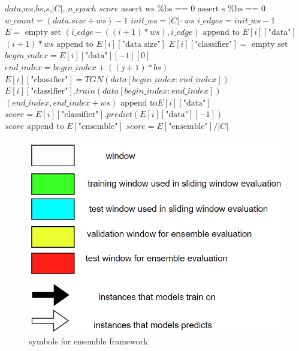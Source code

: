 \documentclass{IEEEtran}
\begin{document}
\begin{algorithm*}
\begin{algorithmic}[1]
\REQUIRE  $data$,$ws$,$bs$,$s$,$\vert C \vert$, $n\_epoch$
\ENSURE $score$
\STATE $\text{assert ws \% bs == 0}$
\STATE $\text{assert s \% bs == 0}$
\STATE $w\_count = (data.size \div ws) - 1$ 
\STATE $init\_ws = \vert C \vert \cdot ws$ 
\STATE $i\_edges = init\_ws - 1$  
\STATE $E = \text{ empty set} $ 
    \STATE $(i\_edge - ((i + 1) *  ws), i\_edge) \text{ append to }E[i][\text{"data"}]$
    \STATE $(i + 1) * ws \text{ append to }E[i][\text{"data size"}]$
    \STATE $E[i][\text{"classifier"}] = \text{ empty set}$
\ENDFOR
{}
                \STATE $begin\_index = E[i][\text{"data"}][-1][0]$
                \STATE $end\_index = begin\_index + ((j + 1) * bs)$
                    \STATE $E[i][\text{"classifier"}] = TGN(data[begin\_index:end\_index])$
                \ENDIF
                \STATE $E[i][\text{"classifier"}].train(data[begin\_index:end\_index])$
            \ENDFOR
        \ENDFOR
        \STATE $(end\_index, end\_index + ws) \text{ append to} E[i][\text{"data"}]$
        \STATE $score = E[i][\text{"classifier"}].predict(E[i][\text{"data"}][-1])$
        \STATE $score \text{ append to } E[\text{"ensemble"}]$
    \ENDFOR
    \STATE $score = E[\text{"ensemble"}]/\vert C \vert$
\ENDFOR
\end{algorithmic}
\end{algorithm*}


\begin{figure}[htbp]
\centering
\includegraphics[width=.9\linewidth]{images/screenshot_20220321_130824.png}
\caption{\label{symbols for ensemble framework}symbols for ensemble framework}
\end{figure}
\end{document}
